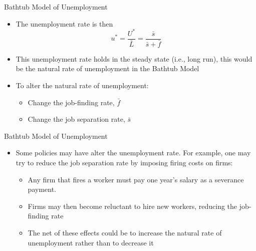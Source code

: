 \documentclass[aspectratio=1610]{beamer}
\begin{document}
\begin{frame}[wide]{Bathtub Model of Unemployment}
	\begin{itemize}
		\item The unemployment rate is then
		\vspace{2mm}
		\[u^* = \frac{U^*}{\bar{L}} = \frac{\bar{s}}{\bar{s} + \bar{f}}\]
		\vspace{2mm}
		\item This unemployment rate holds in the steady state (i.e., long run), this would be the natural rate of unemployment in the Bathtub Model
		\vspace{2mm}
		\item To alter the natural rate of unemployment:
		\begin{itemize}
			\item Change the job-finding rate, $\bar{f}$
			\item Change the job separation rate, $\bar{s}$
		\end{itemize}
	\end{itemize}
\end{frame}

\begin{frame}[wide]{Bathtub Model of Unemployment}
	\begin{itemize}
		\item Some policies may have alter the unemployment rate. 	For example, one may try to reduce the job separation rate by imposing firing costs on firms: 
		\vspace{2mm}
		\begin{itemize}
			\item Any firm that fires a worker must pay one year's salary as a severance payment.
			\item Firms may then become reluctant to hire new workers, reducing the job-finding rate
			\item The net of these effects could be to increase the natural rate of unemployment rather than to decrease it
		\end{itemize}
	\end{itemize}
\end{frame}
\end{document}
